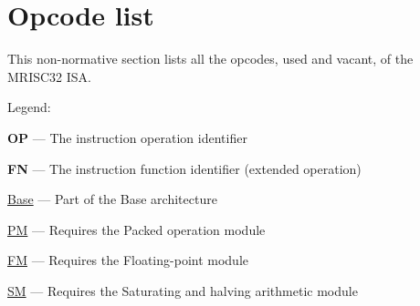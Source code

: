 %

\onecolumn

\chapter{Opcode list}

This non-normative section lists all the opcodes, used and vacant, of the
MRISC32 ISA.

Legend:
\begin{bulletitems}
  \item{\textbf{OP} --- The instruction operation identifier}
  \item{\textbf{FN} --- The instruction function identifier (extended operation)}
  \item{\hyperref[module:Base]{Base} --- Part of the Base architecture}
  \item{\hyperref[module:PM]{PM} --- Requires the Packed operation module}
  \item{\hyperref[module:FM]{FM} --- Requires the Floating-point module}
  \item{\hyperref[module:SM]{SM} --- Requires the Saturating and halving arithmetic module}
\end{bulletitems}



\twocolumn
